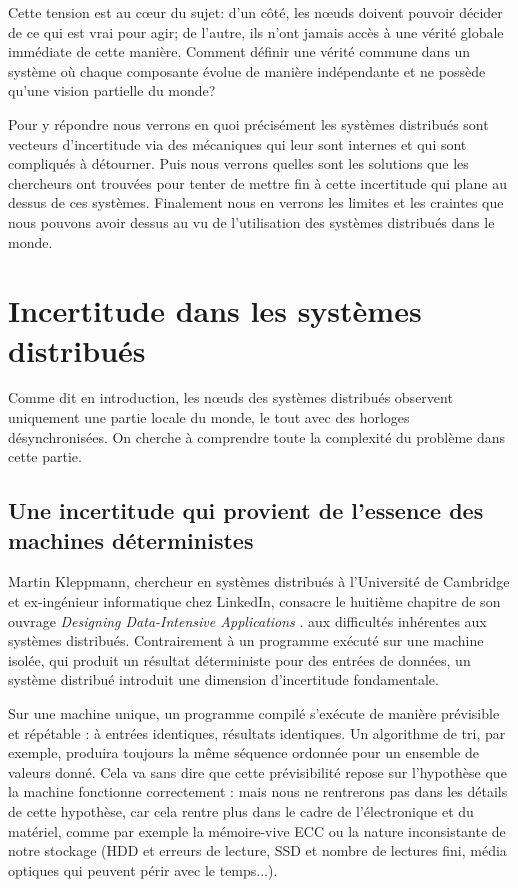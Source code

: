 \documentclass[12pt,a4paper]{article}
\begin{document}
Cette tension est au cœur du sujet: d'un côté, les nœuds doivent pouvoir décider de ce qui est vrai pour agir; de l'autre, ils n'ont jamais accès à une vérité globale immédiate de cette manière. Comment définir une vérité commune dans un système où chaque composante évolue de manière indépendante et ne possède qu'une vision partielle du monde?

Pour y répondre nous verrons en quoi précisément les systèmes distribués sont vecteurs d'incertitude via des mécaniques qui leur sont internes et qui sont compliqués à détourner. Puis nous verrons quelles sont les solutions que les chercheurs ont trouvées pour tenter de mettre fin à cette incertitude qui plane au dessus de ces systèmes. Finalement nous en verrons les limites et les craintes que nous pouvons avoir dessus au vu de l'utilisation des systèmes distribués dans le monde.





\newpage
\section{Incertitude dans les systèmes distribués}

Comme dit en introduction, les nœuds des systèmes distribués observent uniquement une partie locale du monde, le tout avec des horloges désynchronisées. On cherche à comprendre toute la complexité du problème dans cette partie.



\subsection{Une incertitude qui provient de l'essence des machines déterministes}


Martin Kleppmann, chercheur en systèmes distribués à l'Université de Cambridge et ex-ingénieur informatique chez LinkedIn, consacre le huitième chapitre de son ouvrage \textit{Designing Data-Intensive Applications} \cite{Kleppmann2017}. aux difficultés inhérentes aux systèmes distribués. Contrairement à un programme exécuté sur une machine isolée, qui produit un résultat déterministe pour des entrées de données, un système distribué introduit une dimension d'incertitude fondamentale.

\vspace{0.25cm}
Sur une machine unique, un programme compilé s'exécute de manière prévisible et répétable : à entrées identiques, résultats identiques. Un algorithme de tri, par exemple, produira toujours la même séquence ordonnée pour un ensemble de valeurs donné. Cela va sans dire que cette prévisibilité repose sur l'hypothèse que la machine fonctionne correctement : mais nous ne rentrerons pas dans les détails de cette hypothèse, car cela rentre plus dans le cadre de l'électronique et du matériel, comme par exemple la mémoire-vive ECC ou la nature inconsistante de notre stockage (HDD et erreurs de lecture, SSD et nombre de lectures fini, média optiques qui peuvent périr avec le temps...).
\end{document}
